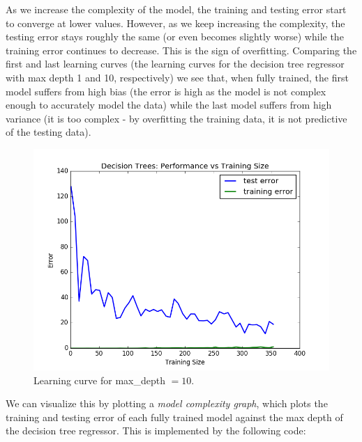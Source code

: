 \documentclass[12 pt]{article}
\numberwithin{equation}{section}
\begin{document}
As we increase the complexity of the model, the training and testing error start to converge at lower values. However, as we keep increasing the complexity, the testing error stays roughly the same (or even becomes slightly worse) while the training error continues to decrease. This is the sign of overfitting. Comparing the first and last learning curves (the learning curves for the decision tree regressor with max depth 1 and 10, respectively) we see that, when fully trained, the first model suffers from high bias (the error is high as the model is not complex enough to accurately model the data) while the last model suffers from high variance (it is too complex - by overfitting the training data, it is not predictive of the testing data). 

\begin{figure}[h]
\begin{center}
		\includegraphics[scale=0.5]{figure_10}
		\caption{Learning curve for max\_depth $= 10$.}
\end{center}
\end{figure}

We can visualize this by plotting a \emph{model complexity graph}, which plots the training and testing error of each fully trained model against the max depth of the decision tree regressor. This is implemented by the following code:
\end{document}

